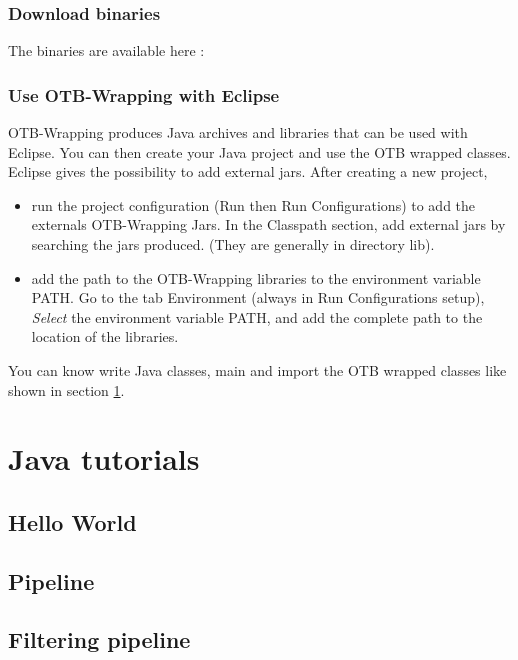 \subsubsection{Download binaries}
The binaries are available here :

\subsubsection{Use OTB-Wrapping with Eclipse}
OTB-Wrapping produces Java archives and libraries that can be used with Eclipse. You can then create your Java project and use the OTB wrapped classes. 
Eclipse gives the possibility to add external jars. 
After creating a new project, 
\begin{itemize}
\item run the project configuration (Run then Run Configurations) to add the externals OTB-Wrapping Jars. In the Classpath section, add external jars 
  by searching the jars produced. (They are generally in directory lib).
\item add the path to the OTB-Wrapping libraries to  the environment variable PATH. Go to the tab Environment (always in Run Configurations setup), 
  \emph{Select} the environment variable PATH, and add the complete path to the location of the libraries.
\end{itemize}

You can know write Java classes, main and import the OTB wrapped classes like shown in section \ref{sec:tuto}.


\normalsize

\section{Java tutorials}\label{sec:tuto}
\subsection{Hello World}


\subsection{Pipeline}


\subsection{Filtering pipeline}


